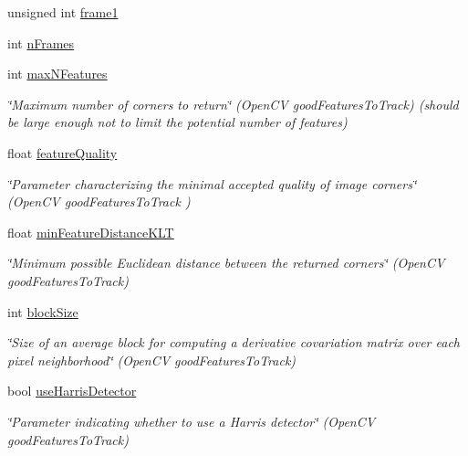 \begin{DoxyCompactItemize}
\item 
unsigned int \hyperlink{structKLTFeatureTrackingParameters_a5cfd406341b9cfc06682c68450034840}{frame1}
\item 
int \hyperlink{structKLTFeatureTrackingParameters_a0c3b89582f2105d0dc3da8f599518031}{n\-Frames}
\item 
int \hyperlink{structKLTFeatureTrackingParameters_a89edeff35aebc548921ea9b6a3501c53}{max\-N\-Features}
\begin{DoxyCompactList}\small\item\em \char`\"{}\-Maximum number of corners to return\char`\"{} (Open\-C\-V good\-Features\-To\-Track) (should be large enough not to limit the potential number of features) \end{DoxyCompactList}\item 
float \hyperlink{structKLTFeatureTrackingParameters_a062d49d0d11189735724e049d9f72765}{feature\-Quality}
\begin{DoxyCompactList}\small\item\em \char`\"{}\-Parameter characterizing the minimal accepted quality of image corners\char`\"{} (Open\-C\-V good\-Features\-To\-Track ) \end{DoxyCompactList}\item 
float \hyperlink{structKLTFeatureTrackingParameters_af9ba36e53a3954620a535fdee4f04686}{min\-Feature\-Distance\-K\-L\-T}
\begin{DoxyCompactList}\small\item\em \char`\"{}\-Minimum possible Euclidean distance between the returned corners\char`\"{} (Open\-C\-V good\-Features\-To\-Track) \end{DoxyCompactList}\item 
int \hyperlink{structKLTFeatureTrackingParameters_af223c42de0f06da1a786451c2d379130}{block\-Size}
\begin{DoxyCompactList}\small\item\em \char`\"{}\-Size of an average block for computing a derivative covariation matrix over each pixel neighborhood\char`\"{} (Open\-C\-V good\-Features\-To\-Track) \end{DoxyCompactList}\item 
bool \hyperlink{structKLTFeatureTrackingParameters_a5157702aea82ce0d2e8a497dd9182c70}{use\-Harris\-Detector}
\begin{DoxyCompactList}\small\item\em \char`\"{}\-Parameter indicating whether to use a Harris detector\char`\"{} (Open\-C\-V good\-Features\-To\-Track) \end{DoxyCompactList}\item 

\end{DoxyCompactItemize}
